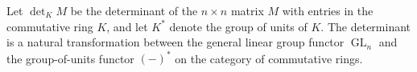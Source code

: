 Let $\det_K M$ be the determinant of the $n \times n$ matrix $M$ with entries in the commutative ring $K$, and let $K^*$ denote the group of units of $K$. The determinant is a natural transformation between the general linear group functor $\operatorname{GL}_n$ and the group-of-units functor $(-)^*$ on the category of commutative rings.
